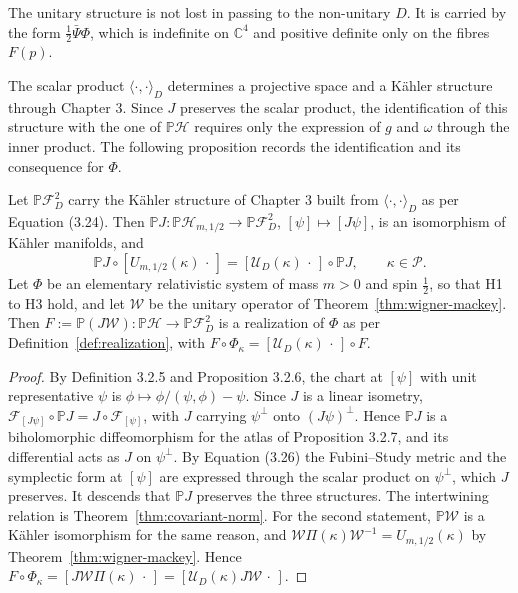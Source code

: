 \noindent The unitary structure is not lost in passing to the non-unitary $D$. It is carried by the form $\tfrac12\bar{\Psi}\Phi$, which is indefinite on $\mathbb{C}^4$ and positive definite only on the fibres $F(p)$.

The scalar product $\langle\cdot,\cdot\rangle_D$ determines a projective space and a Kähler structure through Chapter 3. Since $J$ preserves the scalar product, the identification of this structure with the one of $\mathbb{P}\mathcal{H}$ requires only the expression of $g$ and $\omega$ through the inner product. The following proposition records the identification and its consequence for $\Phi$.

\begin{proposition}\label{prop:kahler-dirac}
	Let $\mathbb{P}\mathcal{F}_D^2$ carry the Kähler structure of Chapter 3 built from $\langle\cdot,\cdot\rangle_D$ as per Equation (3.24). Then $\mathbb{P}J:\mathbb{P}\mathcal{H}_{m,1/2}\to\mathbb{P}\mathcal{F}_D^2$, $[\psi]\mapsto[J\psi]$, is an isomorphism of Kähler manifolds, and
	\begin{equation*}
		\mathbb{P}J\circ[U_{m,1/2}(\kappa)\,\cdot\,]=[\mathcal{U}_D(\kappa)\,\cdot\,]\circ\mathbb{P}J,\qquad \kappa\in\mathcal{P}.
	\end{equation*}
	Let $\Phi$ be an elementary relativistic system of mass $m>0$ and spin $\tfrac12$, so that H1 to H3 hold, and let $\mathcal{W}$ be the unitary operator of Theorem~\ref{thm:wigner-mackey}. Then $F:=\mathbb{P}(J\mathcal{W}):\mathbb{P}\mathcal{H}\to\mathbb{P}\mathcal{F}_D^2$ is a realization of $\Phi$ as per Definition~\ref{def:realization}, with $F\circ\Phi_\kappa=[\mathcal{U}_D(\kappa)\,\cdot\,]\circ F$.
\end{proposition}

\begin{proof}
	By Definition 3.2.5 and Proposition 3.2.6, the chart at $[\psi]$ with unit representative $\psi$ is $\phi\mapsto\phi/(\psi,\phi)-\psi$. Since $J$ is a linear isometry, $\mathcal{F}_{[J\psi]}\circ\mathbb{P}J=J\circ\mathcal{F}_{[\psi]}$, with $J$ carrying $\psi^\perp$ onto $(J\psi)^\perp$. Hence $\mathbb{P}J$ is a biholomorphic diffeomorphism for the atlas of Proposition 3.2.7, and its differential acts as $J$ on $\psi^\perp$. By Equation (3.26) the Fubini--Study metric and the symplectic form at $[\psi]$ are expressed through the scalar product on $\psi^\perp$, which $J$ preserves. It descends that $\mathbb{P}J$ preserves the three structures. The intertwining relation is Theorem~\ref{thm:covariant-norm}. For the second statement, $\mathbb{P}\mathcal{W}$ is a Kähler isomorphism for the same reason, and $\mathcal{W}\Pi(\kappa)\mathcal{W}^{-1}=U_{m,1/2}(\kappa)$ by Theorem~\ref{thm:wigner-mackey}. Hence $F\circ\Phi_\kappa=[J\mathcal{W}\Pi(\kappa)\,\cdot\,]=[\mathcal{U}_D(\kappa)J\mathcal{W}\,\cdot\,]$.
\end{proof}

